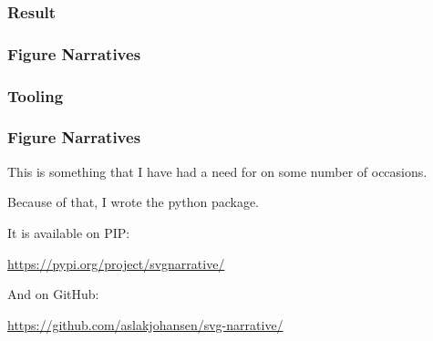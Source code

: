{\subsubsection{Result}
\begin{frame}[fragile]
  \frametitle{Figure Narratives }
  \vspace{-14mm}
  \begin{center}
  \end{center}
\end{frame}

\subsubsection{Tooling}
\begin{frame}[fragile]
  \frametitle{Figure Narratives }
  \vspace{3mm}
  This is something that I have had a need for on some number of occasions.
  
  \vspace{5mm}
  Because of that, I wrote the  python package.
  
  \pause
  \vspace{5mm}
  It is available on PIP:
  \begin{center}
    \textcolor{blue}{\url{https://pypi.org/project/svgnarrative/}}
  \end{center}
  
  \vspace{5mm}
  And on GitHub:
  \begin{center}
    \textcolor{blue}{\url{https://github.com/aslakjohansen/svg-narrative/}}
  \end{center}
\end{frame}

}


